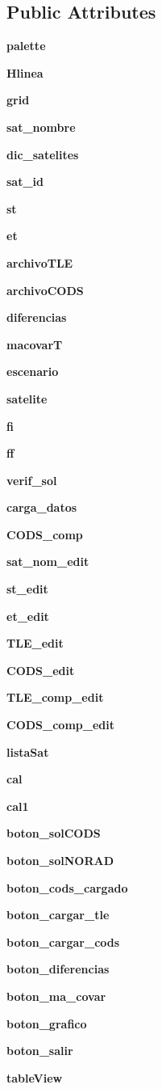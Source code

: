\subsection*{\-Public \-Attributes}
\begin{DoxyCompactItemize}
\item 
{\bf palette}
\item 
{\bf \-Hlinea}
\item 
{\bf grid}
\item 
{\bf sat\-\_\-nombre}
\item 
{\bf dic\-\_\-satelites}
\item 
{\bf sat\-\_\-id}
\item 
{\bf st}
\item 
{\bf et}
\item 
{\bf archivo\-T\-L\-E}
\item 
{\bf archivo\-C\-O\-D\-S}
\item 
{\bf diferencias}
\item 
{\bf macovar\-T}
\item 
{\bf escenario}
\item 
{\bf satelite}
\item 
{\bf fi}
\item 
{\bf ff}
\item 
{\bf verif\-\_\-sol}
\item 
{\bf carga\-\_\-datos}
\item 
{\bf \-C\-O\-D\-S\-\_\-comp}
\item 
{\bf sat\-\_\-nom\-\_\-edit}
\item 
{\bf st\-\_\-edit}
\item 
{\bf et\-\_\-edit}
\item 
{\bf \-T\-L\-E\-\_\-edit}
\item 
{\bf \-C\-O\-D\-S\-\_\-edit}
\item 
{\bf \-T\-L\-E\-\_\-comp\-\_\-edit}
\item 
{\bf \-C\-O\-D\-S\-\_\-comp\-\_\-edit}
\item 
{\bf lista\-Sat}
\item 
{\bf cal}
\item 
{\bf cal1}
\item 
{\bf boton\-\_\-sol\-C\-O\-D\-S}
\item 
{\bf boton\-\_\-sol\-N\-O\-R\-A\-D}
\item 
{\bf boton\-\_\-cods\-\_\-cargado}
\item 
{\bf boton\-\_\-cargar\-\_\-tle}
\item 
{\bf boton\-\_\-cargar\-\_\-cods}
\item 
{\bf boton\-\_\-diferencias}
\item 
{\bf boton\-\_\-ma\-\_\-covar}
\item 
{\bf boton\-\_\-grafico}
\item 
{\bf boton\-\_\-salir}
\item 
{\bf table\-View}
\end{DoxyCompactItemize}



